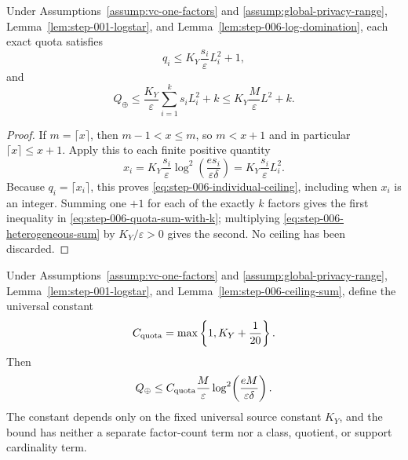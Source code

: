 \begin{lemma}
\label{lem:step-006-ceiling-sum}
Under Assumptions~\ref{assump:vc-one-factors} and
\ref{assump:global-privacy-range}, Lemma~\ref{lem:step-001-logstar}, and
Lemma~\ref{lem:step-006-log-domination}, each exact quota satisfies
\begin{equation}\label{eq:step-006-individual-ceiling}
q_i\le K_Y\frac{s_i}{\varepsilon}L_i^2+1,
\end{equation}
and
\begin{equation}\label{eq:step-006-quota-sum-with-k}
Q_\oplus
\le\frac{K_Y}{\varepsilon}\sum_{i=1}^ks_iL_i^2+k
\le K_Y\frac{M}{\varepsilon}L^2+k.
\end{equation}
\end{lemma}

\begin{proof}
If \(m=\lceil x\rceil\), then \(m-1<x\le m\), so
\(m<x+1\) and in particular \(\lceil x\rceil\le x+1\).  Apply this to
each finite positive quantity
\begin{equation}\label{eq:step-006-ceiling-input}
x_i=K_Y\frac{s_i}{\varepsilon}
\log^2\!\left(\frac{es_i}{\varepsilon\delta}\right)
=K_Y\frac{s_i}{\varepsilon}L_i^2.
\end{equation}
Because \(q_i=\lceil x_i\rceil\), this proves
\eqref{eq:step-006-individual-ceiling}, including when \(x_i\) is an
integer.  Summing one \(+1\) for each of the exactly \(k\) factors gives
the first inequality in \eqref{eq:step-006-quota-sum-with-k}; multiplying
\eqref{eq:step-006-heterogeneous-sum} by \(K_Y/\varepsilon>0\) gives the
second.  No ceiling has been discarded.
\end{proof}

\begin{proposition}
\label{prop:step-006-public-quota-bridge}
Under Assumptions~\ref{assump:vc-one-factors} and
\ref{assump:global-privacy-range}, Lemma~\ref{lem:step-001-logstar}, and
Lemma~\ref{lem:step-006-ceiling-sum}, define the universal constant
\begin{equation}\label{eq:step-006-cquota}
C_{\rm quota}=\max\left\{1,K_Y+\frac1{20}\right\}.
\end{equation}
Then
\begin{equation}\label{eq:step-006-public-quota-rate}
Q_\oplus
\le C_{\rm quota}\frac{M}{\varepsilon}
\log^2\!\left(\frac{eM}{\varepsilon\delta}\right).
\end{equation}
The constant depends only on the fixed universal source constant \(K_Y\),
and the bound has neither a separate factor-count term nor a class,
quotient, or support cardinality term.
\end{proposition}

